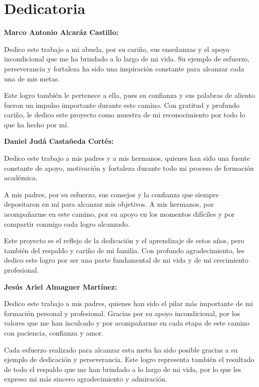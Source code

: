  \chapter{Dedicatoria}

\textbf{Marco Antonio Alcaráz Castillo:}

Dedico este trabajo a mi abuela, por su cariño, sus enseñanzas y el apoyo incondicional que me ha brindado a lo largo de mi vida. Su ejemplo de esfuerzo, perseverancia y fortaleza ha sido una inspiración constante para alcanzar cada una de mis metas.

Este logro también le pertenece a ella, pues su confianza y sus palabras de aliento fueron un impulso importante durante este camino. Con gratitud y profundo cariño, le dedico este proyecto como muestra de mi reconocimiento por todo lo que ha hecho por mí.


\textbf{Daniel Judá Castañeda Cortés:}

Dedico este trabajo a mis padres y a mis hermanos, quienes han sido una fuente constante de apoyo, motivación y fortaleza durante todo mi proceso de formación académica.

A mis padres, por su esfuerzo, sus consejos y la confianza que siempre depositaron en mí para alcanzar mis objetivos. A mis hermanos, por acompañarme en este camino, por su apoyo en los momentos difíciles y por compartir conmigo cada logro alcanzado.

Este proyecto es el reflejo de la dedicación y el aprendizaje de estos años, pero también del respaldo y cariño de mi familia. Con profundo agradecimiento, les dedico este logro por ser una parte fundamental de mi vida y de mi crecimiento profesional.
\clearpage

\textbf{Jesús Ariel Almaguer Martínez:}

Dedico este trabajo a mis padres, quienes han sido el pilar más importante de mi formación personal y profesional. Gracias por su apoyo incondicional, por los valores que me han inculcado y por acompañarme en cada etapa de este camino con paciencia, confianza y amor.

Cada esfuerzo realizado para alcanzar esta meta ha sido posible gracias a su ejemplo de dedicación y perseverancia. Este logro representa también el resultado de todo el respaldo que me han brindado a lo largo de mi vida, por lo que les expreso mi más sincero agradecimiento y admiración.





\endinput